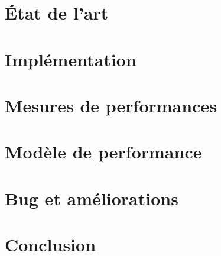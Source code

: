 \documentclass[12pt,a4paper]{report}
\begin{document}
\chapter{État de l'art}\label{title-sota}


\chapter{Implémentation}\label{title-implementation}


\chapter{Mesures de performances}\label{title-mesures_perf}


\chapter{Modèle de performance}\label{title-modele_perf}


\chapter{Bug et améliorations}\label{title-ameliorations}


\chapter{Conclusion}\label{title-conclusion}



%
%

\end{document}
